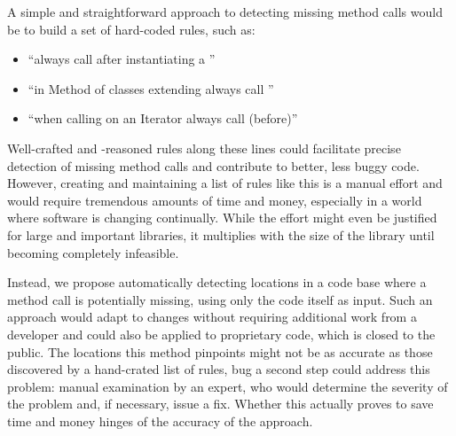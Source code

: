 A simple and straightforward approach to detecting missing method calls would be to build a set of hard-coded rules, such as:
\begin{itemize}
    \item ``always call  after instantiating a ''
    \item ``in Method  of classes extending  always call ''
    \item ``when calling  on an Iterator always call  (before)''
\end{itemize}
Well-crafted and -reasoned rules along these lines could facilitate precise detection of missing method calls and contribute to better, less buggy code.
However, creating and maintaining a list of rules like this is a manual effort and would require tremendous amounts of time and money, especially in a world where software is changing continually.
While the effort might even be justified for large and important libraries, it multiplies with the size of the library until becoming completely infeasible.

Instead, we propose automatically detecting locations in a code base where a method call is potentially missing, using only the code itself as input.
Such an approach would adapt to changes without requiring additional work from a developer and could also be applied to proprietary code, which is closed to the public.
The locations this method pinpoints might not be as accurate as those discovered by a hand-crated list of rules, bug a second step could address this problem: manual examination by an expert, who would determine the severity of the problem and, if necessary, issue a fix.
Whether this actually proves to save time and money hinges of the accuracy of the approach.


